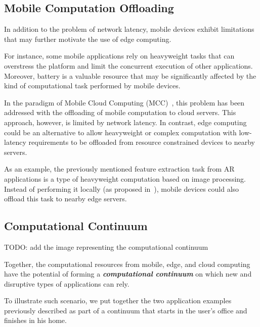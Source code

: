 \subsection{Mobile Computation Offloading}

In addition to the problem of network latency, mobile devices exhibit limitations that may further motivate the use of edge computing. 

For instance, some mobile applications rely on heavyweight tasks that can overstress the platform and limit the concurrent execution of other applications. Moreover, battery is a valuable resource that may be significantly affected by the kind of computational task performed by mobile devices. 

In the paradigm of Mobile Cloud Computing (MCC)~\cite{}, this problem has been addressed with the offloading of mobile computation to cloud servers. This approach, however, is limited by network latency. In contrast, edge computing could be an alternative to allow heavyweight or complex computation with low-latency requirements to be offloaded from resource constrained devices to nearby servers.


As an example, the previously mentioned feature extraction task from AR applications is a type of heavyweight computation based on image processing. Instead of performing it locally (as proposed in~\cite{}), mobile devices could also offload this task to nearby edge servers. 

\subsection{Computational Continuum}

TODO: add the image representing the computational continuum

Together, the computational resources from mobile, edge, and cloud computing have the potential of forming a \textit{\textbf{computational continuum}} on which new and disruptive types of applications can rely. 

To illustrate such scenario, we put together the two application examples previously described as part of a continuum that starts in the user's office and finishes in his home. 

